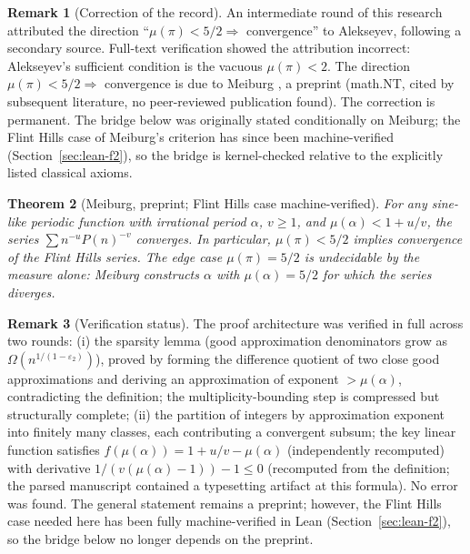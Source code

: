 \documentclass[11pt]{amsart}
\newtheorem{theorem}{Theorem}[section]
\theoremstyle{definition}
\newtheorem{remark}[theorem]{Remark}
\theoremstyle{remark}
\numberwithin{equation}{section}
\newcommand{\irr}{\mu}
\begin{document}
\begin{remark}[Correction of the record]
An intermediate round of this research attributed the direction ``$\irr(\pi)<5/2\Rightarrow$ convergence'' to Alekseyev, following a secondary source. Full-text verification showed the attribution incorrect: Alekseyev's sufficient condition is the vacuous $\irr(\pi)<2$. The direction $\irr(\pi)<5/2\Rightarrow$ convergence is due to Meiburg \cite{Meiburg2022}, a preprint (math.NT, cited by subsequent literature, no peer-reviewed publication found). The correction is permanent. The bridge below was originally stated conditionally on Meiburg; the Flint Hills case of Meiburg's criterion has since been machine-verified (Section~\ref{sec:lean-f2}), so the bridge is kernel-checked relative to the explicitly listed classical axioms.
\end{remark}

\begin{theorem}[Meiburg, preprint; Flint Hills case machine-verified]\label{thm:meiburg}
For any sine-like periodic function with irrational period $\alpha$, $v\ge1$, and $\irr(\alpha)<1+u/v$, the series $\sum n^{-u}P(n)^{-v}$ converges. In particular, $\irr(\pi)<5/2$ implies convergence of the Flint Hills series. The edge case $\irr(\pi)=5/2$ is undecidable by the measure alone: Meiburg constructs $\alpha$ with $\irr(\alpha)=5/2$ for which the series diverges.
\end{theorem}

\begin{remark}[Verification status]
The proof architecture was verified in full across two rounds: (i) the sparsity lemma (good approximation denominators grow as $\Omega(n^{1/(1-\varepsilon_2)})$), proved by forming the difference quotient of two close good approximations and deriving an approximation of exponent $>\irr(\alpha)$, contradicting the definition; the multiplicity-bounding step is compressed but structurally complete; (ii) the partition of integers by approximation exponent into finitely many classes, each contributing a convergent subsum; the key linear function satisfies $f(\irr(\alpha))=1+u/v-\irr(\alpha)$ (independently recomputed) with derivative $1/(v(\irr(\alpha)-1))-1\le0$ (recomputed from the definition; the parsed manuscript contained a typesetting artifact at this formula). No error was found. The general statement remains a preprint; however, the Flint Hills case needed here has been fully machine-verified in Lean (Section~\ref{sec:lean-f2}), so the bridge below no longer depends on the preprint.
\end{remark}
\end{document}
